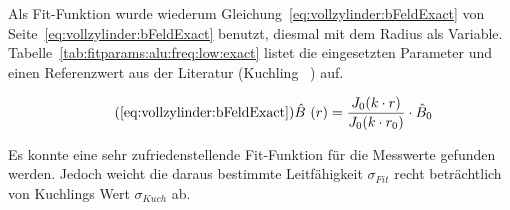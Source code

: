 {\begin{minipage}[t]{0.33\textwidth}
\begin{minipage}[t]{0.5\textwidth}
\begin{center}
            \end{center}
        \end{minipage}%
        \begin{minipage}[t]{0.5\textwidth}
            \vspace{0mm}
            Als             Fit-Funktion            wurde             wiederum
            Gleichung~\ref{eq:vollzylinder:bFeldExact}                     von
            Seite~\ref{eq:vollzylinder:bFeldExact}       benutzt,      diesmal
            mit           dem          Radius           als          Variable.
            Tabelle~\ref{tab:fitparams:alu:freq:low:exact}      listet     die
            eingesetzten Parameter  und einen  Referenzwert aus  der Literatur
            (Kuchling ~\cite{ref:kuchling:resistivityTable}) auf.

            \begin{equation}
                \tag{\ref{eq:vollzylinder:bFeldExact}}
                \hat{B}~(r) = \frac{J_0 (k \cdot r)}{J_0 (k \cdot r_0)} \cdot \hat{B}_0
            \end{equation}

            Es  konnte eine  sehr  zufriedenstellende  Fit-Funktion f\"ur  die
            Messwerte  gefunden  werden. Jedoch  weicht die  daraus  bestimmte
            Leitf\"ahigkeit $\sigma_{Fit}$ recht betr\"achtlich von  Kuchlings
            Wert $\sigma_{Kuch}$ ab.
        \end{minipage}%

        \begin{minipage}[c][][b]{0.5\textwidth}
            \vspace{0pt}
            
        \end{minipage}%
        \begin{minipage}[c][][b]{0.5\textwidth}
            \resizebox{\textwidth}{!}{}
            \label{fig:alu:rad:low:sensor}
        \end{minipage}
	\end{minipage}%
	\begin{minipage}[t]{0.67\textwidth}
        \vspace{0mm}
        \hfill
        \resizebox{.95\textwidth}{!}{}
        \label{fig:alu:rad:exact:low}
	\end{minipage}

}
